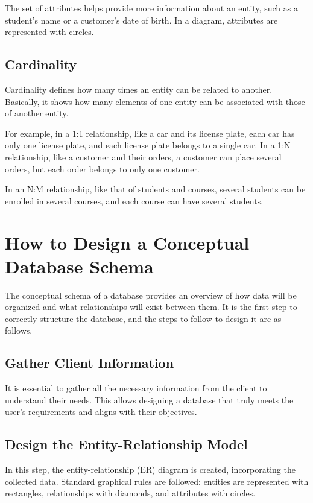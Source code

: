 \documentclass{article}
\begin{document}
The set of attributes helps provide more information about an entity, such as a student's name or a customer's date of birth. In a diagram, attributes are represented with circles.

\subsection{Cardinality}

Cardinality defines how many times an entity can be related to another. Basically, it shows how many elements of one entity can be associated with those of another entity.

For example, in a 1:1 relationship, like a car and its license plate, each car has only one license plate, and each license plate belongs to a single car. In a 1:N relationship, like a customer and their orders, a customer can place several orders, but each order belongs to only one customer.

In an N:M relationship, like that of students and courses, several students can be enrolled in several courses, and each course can have several students.

\section{How to Design a Conceptual Database Schema}

The conceptual schema of a database provides an overview of how data will be organized and what relationships will exist between them. It is the first step to correctly structure the database, and the steps to follow to design it are as follows.

\subsection{Gather Client Information}

It is essential to gather all the necessary information from the client to understand their needs. This allows designing a database that truly meets the user's requirements and aligns with their objectives.

\subsection{Design the Entity-Relationship Model}

In this step, the entity-relationship (ER) diagram is created, incorporating the collected data. Standard graphical rules are followed: entities are represented with rectangles, relationships with diamonds, and attributes with circles.
\end{document}
